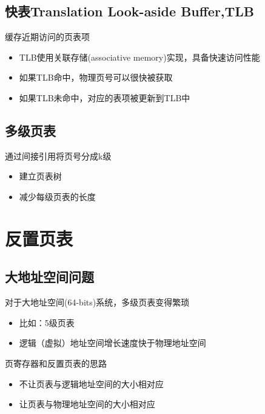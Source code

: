 \subsection{快表Translation Look-aside Buffer,TLB}
缓存近期访问的页表项
\begin{itemize}
	\item TLB使用关联存储(associative memory)实现，具备快速访问性能
	\item 如果TLB命中，物理页号可以很快被获取
	\item 如果TLB未命中，对应的表项被更新到TLB中
\end{itemize}
\subsection{多级页表}
通过间接引用将页号分成k级
\begin{itemize}
	\item 建立页表树
	\item 减少每级页表的长度
\end{itemize}

\section{反置页表}
\subsection{大地址空间问题}
对于大地址空间(64-bits)系统，多级页表变得繁琐
\begin{itemize}
	\item 比如：5级页表
	\item 逻辑（虚拟）地址空间增长速度快于物理地址空间
\end{itemize}
页寄存器和反置页表的思路
\begin{itemize}
	\item 不让页表与逻辑地址空间的大小相对应
	\item 让页表与物理地址空间的大小相对应
\end{itemize}
